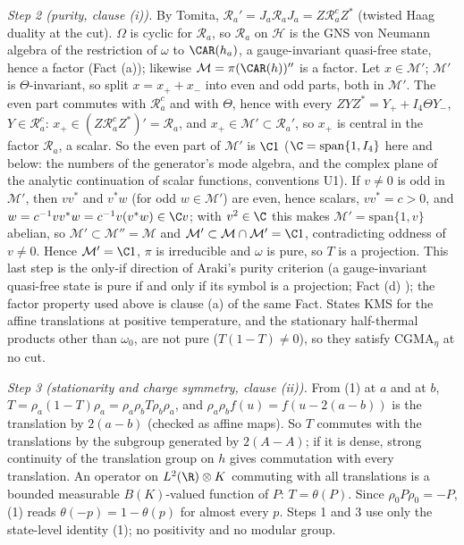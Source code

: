 \emph{Step 2 (purity, clause (i)).} By Tomita, $\mathcal{R}_{a}' = J_{a}\mathcal{R}_{a}J_{a} = Z\mathcal{R}_{a}^{c}Z^{*}$ (twisted Haag duality at the cut). $\Omega$ is cyclic for $\mathcal{R}_{a}$, so $\mathcal{R}_{a}$ on $\mathcal{H}$ is the GNS von Neumann algebra of the restriction of $\omega$ to $\CAR(h_{a})$, a gauge-invariant quasi-free state, hence a factor (Fact (a)); likewise $\mathcal{M} = \pi(\CAR(h))''$ is a factor. Let $x \in \mathcal{M}'$; $\mathcal{M}'$ is $\Theta$-invariant, so split $x = x_{+} + x_{-}$ into even and odd parts, both in $\mathcal{M}'$. The even part commutes with $\mathcal{R}_{a}^{c}$ and with $\Theta$, hence with every $ZYZ^{*} = Y_{+} + I_{4}\Theta Y_{-}$, $Y \in \mathcal{R}_{a}^{c}$: $x_{+} \in (Z\mathcal{R}_{a}^{c}Z^{*})' = \mathcal{R}_{a}$, and $x_{+} \in \mathcal{M}' \subset \mathcal{R}_{a}'$, so $x_{+}$ is central in the factor $\mathcal{R}_{a}$, a scalar. So the even part of $\mathcal{M}'$ is $\C 1$ ($\C = \mathrm{span}\{1, I_4\}$ here and below: the numbers of the generator's mode algebra, and the complex plane of the analytic continuation of scalar functions, conventions U1). If $v \ne 0$ is odd in $\mathcal{M}'$, then $vv^{*}$ and $v^{*}w$ (for odd $w \in \mathcal{M}'$) are even, hence scalars, $vv^{*} = c > 0$, and $w = c^{-1}vv^{*}w = c^{-1}v(v^{*}w) \in \C v$; with $v^{2} \in \C$ this makes $\mathcal{M}' = \mathrm{span}\{1, v\}$ abelian, so $\mathcal{M}' \subset \mathcal{M}'' = \mathcal{M}$ and $\mathcal{M}' \subset \mathcal{M}\cap\mathcal{M}' = \C 1$, contradicting oddness of $v \ne 0$. Hence $\mathcal{M}' = \C 1$, $\pi$ is irreducible and $\omega$ is pure, so $T$ is a projection. This last step is the only-if direction of Araki's purity criterion (a gauge-invariant quasi-free state is pure if and only if its symbol is a projection; Fact (d) \cite{Araki1970}); the factor property used above is clause (a) of the same Fact. States KMS for the affine translations at positive temperature, and the stationary half-thermal products other than $\omega_{0}$, are not pure ($T(1 - T) \ne 0$), so they satisfy CGMA$_{\eta}$ at no cut.

\emph{Step 3 (stationarity and charge symmetry, clause (ii)).} From (1) at $a$ and at $b$, $T = \rho_{a}(1 - T)\rho_{a} = \rho_{a}\rho_{b}T\rho_{b}\rho_{a}$, and $\rho_{a}\rho_{b}f(u) = f(u - 2(a - b))$ is the translation by $2(a - b)$ (checked as affine maps). So $T$ commutes with the translations by the subgroup generated by $2(A - A)$; if it is dense, strong continuity of the translation group on $h$ gives commutation with every translation. An operator on $L^{2}(\R)\otimes K$ commuting with all translations is a bounded measurable $B(K)$-valued function of $P$: $T = \theta(P)$. Since $\rho_{0}P\rho_{0} = -P$, (1) reads $\theta(-p) = 1 - \theta(p)$ for almost every $p$. Steps 1 and 3 use only the state-level identity (1); no positivity and no modular group.


